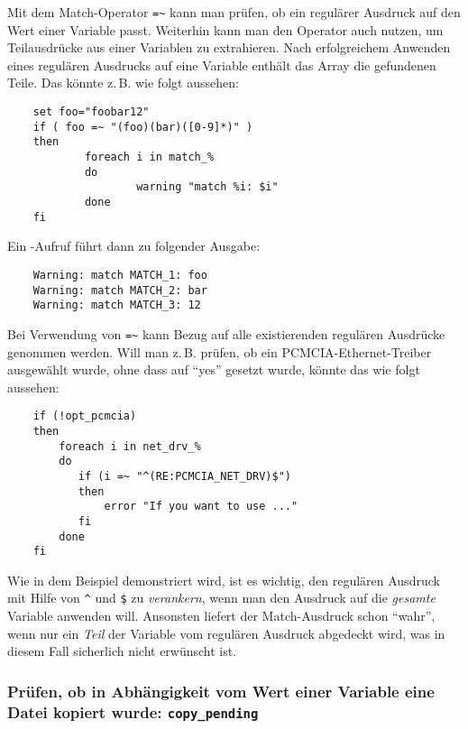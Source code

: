 Mit dem Match-Operator \verb?=~? kann man prüfen, ob ein regulärer
Ausdruck auf den Wert einer Variable passt. Weiterhin kann man
den Operator auch nutzen, um Teilausdrücke aus einer Variablen zu
extrahieren. Nach erfolgreichem Anwenden eines regulären Ausdrucks auf
eine Variable enthält das Array  die gefundenen Teile. Das
könnte z.\,B. wie folgt aussehen:

\begin{example}
\begin{verbatim}
    set foo="foobar12"
    if ( foo =~ "(foo)(bar)([0-9]*)" )
    then
            foreach i in match_%
            do
                    warning "match %i: $i"
            done
    fi
\end{verbatim}
\end{example}

Ein -Aufruf führt dann zu folgender Ausgabe:

\begin{example}
\begin{verbatim}
    Warning: match MATCH_1: foo
    Warning: match MATCH_2: bar
    Warning: match MATCH_3: 12
\end{verbatim}
\end{example}

Bei Verwendung von \verb?=~? kann Bezug auf alle existierenden
regulären Ausdrücke genommen werden. Will man z.\,B. prüfen, ob ein
PCMCIA-Ethernet-Treiber ausgewählt wurde, ohne dass  auf
"`yes"' gesetzt wurde, könnte das wie folgt aussehen:

\begin{example}
\begin{verbatim}
    if (!opt_pcmcia)
    then
        foreach i in net_drv_%
        do
           if (i =~ "^(RE:PCMCIA_NET_DRV)$")
           then
               error "If you want to use ..."
           fi
        done
    fi
\end{verbatim}
\end{example}

Wie in dem Beispiel demonstriert wird, ist es wichtig, den regulären Ausdruck
mit Hilfe von \texttt{\^} und \texttt{\$} zu \emph{verankern}, wenn man den
Ausdruck auf die \emph{gesamte} Variable anwenden will. Ansonsten liefert der
Match-Ausdruck schon "`wahr"', wenn nur ein \emph{Teil} der Variable vom
regulären Ausdruck abgedeckt wird, was in diesem Fall sicherlich nicht
erwünscht ist.

\subsubsection{Prüfen, ob in Abhängigkeit vom Wert einer Variable eine
  Datei kopiert wurde: \texttt{copy\_pending}}

